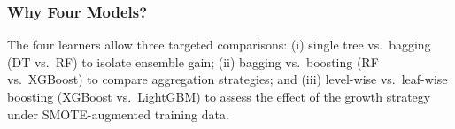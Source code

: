 \subsubsection*{Why Four Models?}
The four learners allow three targeted comparisons: (i) single tree vs.\ bagging (DT vs.\ RF) to isolate ensemble gain; (ii) bagging vs.\ boosting (RF vs.\ XGBoost) to compare aggregation strategies; and (iii) level-wise vs.\ leaf-wise boosting (XGBoost vs.\ LightGBM) to assess the effect of the growth strategy under SMOTE-augmented training data.
